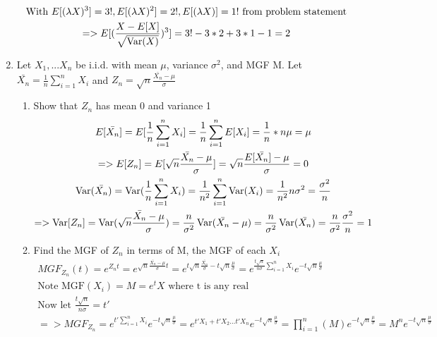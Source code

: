 \documentclass[11pt]{article}
\newcommand{\Var}{\mathop{\rm Var}}
\begin{document}
\begin{enumerate}
\begin{gather}
	\text{With }E[(\lambda X)^3] = 3!, E[(\lambda X)^2] = 2!, E[(\lambda X)]=1! \text{ from problem statement}\\
	=> E[(\frac{X-E[X]}{\sqrt{\Var(X)}})^3] = 3! - 3*2 + 3*1 - 1 = 2
\end{gather}
\item Let $X_1,...X_n$ be i.i.d. with mean $\mu$, variance $\sigma^2$, and MGF M. Let \\
 $\bar{X_n}=\frac{1}{n}\sum_{i=1}^{n} X_i$ 
 and
 $Z_n = \sqrt{n}\frac{\bar{X_n}-\mu}{\sigma}$
\begin{enumerate}
	\item Show that $Z_n$ has mean 0 and variance 1
	\begin{gather}
		E[\bar{X_n}]=E[\frac{1}{n}\sum_{i=1}^{n} X_i] = \frac{1}{n}\sum_{i=1}^{n} E[X_i] =  \frac{1}{n} * n\mu =\mu\\
		=> E[Z_n] = E[\sqrt{n}\frac{\bar{X_n}-\mu}{\sigma}] = \sqrt{n}\frac{E[\bar{X_n}]-\mu}{\sigma} = 0\\
		\Var(\bar{X_n}) = \Var(\frac{1}{n}\sum_{i=1}^{n} X_i) = \frac{1}{n^2}\sum_{i=1}^{n} \Var(X_i) = \frac{1}{n^2} n\sigma^2=\frac{\sigma^2}{n}\\
		=> \Var[Z_n]=\Var(\sqrt{n}\frac{\bar{X_n}-\mu}{\sigma}) = \frac{n}{\sigma^2}\Var(\bar{X_n}-\mu) = \frac{n}{\sigma^2}\Var(\bar{X_n})= \frac{n}{\sigma^2}\frac{\sigma^2}{n}=1
	\end{gather}
	\item Find the MGF of $Z_n$ in terms of M, the MGF of each $X_i$
	\begin{gather}
		MGF_{Z_n}(t)=e^{Z_nt} = e^{\sqrt{n}\frac{\bar{X_n}-\mu}{\sigma}t} =  e^{t\sqrt{n}\frac{\bar{X_n}}{\sigma} -t\sqrt{n}\frac{\mu}{\sigma}} = e^{\frac{t\sqrt{n}}{n\sigma}\sum_{i=1}^{n} X_i}e^{-t\sqrt{n}\frac{\mu}{\sigma}}\\
		\text{Note MGF}(X_i) = M = e^tX \text{ where t is any real}\\
		\text{Now let }\frac{t\sqrt{n}}{n\sigma} = t' \\
		=> MGF_{Z_n} = e^{t'\sum_{i=1}^{n} X_i}e^{-t\sqrt{n}\frac{\mu}{\sigma}} =  e^{t'X_1+t'X_2...t'X_n}e^{-t\sqrt{n}\frac{\mu}{\sigma}}= \prod_{i=1}^{n}(M)e^{-t\sqrt{n}\frac{\mu}{\sigma}} = M^ne^{-t\sqrt{n}\frac{\mu}{\sigma}}
	\end{gather}
\end{enumerate}
\end{enumerate}
\end{document}
